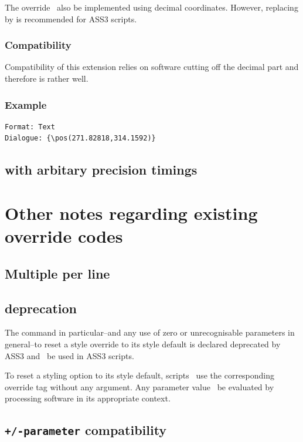 \documentclass{spec}
\begin{document}
The  override \should\ also be implemented using
decimal coordinates. However, replacing  by
 is recommended for ASS3 scripts.

\subsubsection*{Compatibility}
Compatibility of this extension relies on software cutting off
the decimal part and therefore is rather well.
 
\subsubsection*{Example}
\begin{verbatim}
Format: Text
Dialogue: {\pos(271.82818,314.1592)}
\end{verbatim}

\subsection{\todo {} with arbitary precision timings}

\section{Other notes regarding existing override codes}
\subsection{\todo Multiple  per line}

\subsection{ deprecation}

The  command in particular--and any use of zero or unrecognisable
parameters in general--to reset a style override to its style default is
declared deprecated by ASS3 and \mustnot\ be used in ASS3 scripts.

To reset a styling option to its style default, scripts \may\ use the
corresponding override tag without any argument. Any parameter value
\must\ be evaluated by processing software in its appropriate context.

\subsection{\texttt{+/-parameter} compatibility}
\end{document}
